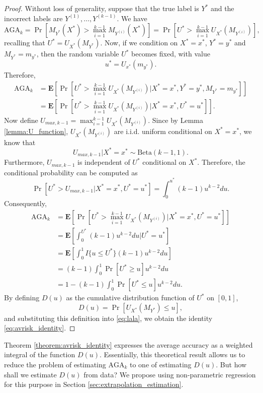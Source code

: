 \documentclass[twoside,11pt]{article}
\newcommand{\E}{\textbf{E}}
\begin{document}
\begin{proof} Without loss of generality, suppose that the true label is $Y^*$ and
the incorrect labels are $Y^{(1)},\hdots, Y^{(k-1)}$.  We have
\[
\text{AGA}_k = \Pr[M_{Y^*}(X^*) > \max_{i=1}^{k-1} M_{Y^{(i)}}(X^*)]
= \Pr[U^* > \max_{i=1}^{k-1} U_{X^*}(M_{Y^{(i)}})],
\]
recalling that $U^* = U_{X^*}(M_{Y^*})$.  Now, if we condition on $X^*
= x^*$, $Y^* = y^*$ and $M_{Y^*} = m_{y^*}$, then the random variable
$U^*$ becomes fixed, with value
\[
u^* = U_{x^*}(m_{y^*}).
\]
Therefore,
\begin{align*}
\text{AGA}_k &=\E[\Pr[U^* > \max_{i=1}^{k-1} U_{X^*}(M_{Y^{(i)}})|X^* = x^*, Y^* = y^*, M_{Y^*} = m_{y^*}]]
\\&= \E[\Pr[U^* > \max_{i=1}^{k-1} U_{X^*}(M_{Y^{(i)}})|X^* = x^*, U^* = u^*]].
\end{align*}
Now define $U_{max, k-1} = \max_{i=1}^{k-1} U_{X^*}(M_{Y^{(i)}})$. 
Since by Lemma \ref{lemma:U_function},
$U_{X^*}(M_{Y^{(i)}})$ are i.i.d. uniform conditional on $X^* = x^*$, we know that
\begin{equation}\label{eq:umax_beta}
U_{max, k-1}|X^* = x^* \sim \text{Beta}(k-1, 1). 
\end{equation}
Furthermore, $U_{max, k-1}$ is independent of $U^*$ conditional on
$X^*$.  Therefore, the conditional probability can be computed as
\[
\Pr[U^* > U_{max, k-1}|X^* = x^*, U^* = u^*] = \int_0^{u^*} (k-1) u^{k-2} du.
\]
Consequently,
\begin{align}
\text{AGA}_k &= \E[\Pr[U^* > \max_{i=1}^{k-1} U_{X^*}(M_{Y^{(i)}})|X^* = x^*, U^* = u^*]]
\\&= \E[\int_0^{U^*} (k-1) u^{k-2} du|U^* = u^*]
\\&= \E[\int_0^1 I\{u \leq U^*\} (k-1) u^{k-2} du ]
\\&= (k-1) \int_0^1 \Pr[U^* \geq u] u^{k-2} du
\\&= 1 - (k-1) \int_0^1 \Pr[U^* \leq u] u^{k-2} du. \label{eq:lala}
\end{align}
By defining ${D}(u)$ as the cumulative distribution function of
$U^*$ on $[0,1]$,
\begin{equation}\label{eq:Kbar}
{D}(u) = \Pr[U_{X^*}(M_{Y^*}) \leq u],
\end{equation}
and substituting this definition into \eqref{eq:lala}, we obtain the identity \eqref{eq:avrisk_identity}.
\end{proof}


Theorem \ref{theorem:avrisk_identity} expresses the average accuracy
as a weighted integral of the function ${D}(u)$.  Essentially, this theoretical result allows us
to reduce the problem of estimating $\text{AGA}_k$ to one of estimating $D(u)$.
But how shall we estimate $D(u)$ from data?
We propose using non-parametric regression for this purpose in Section \ref{sec:extrapolation_estimation}.
\end{document}
